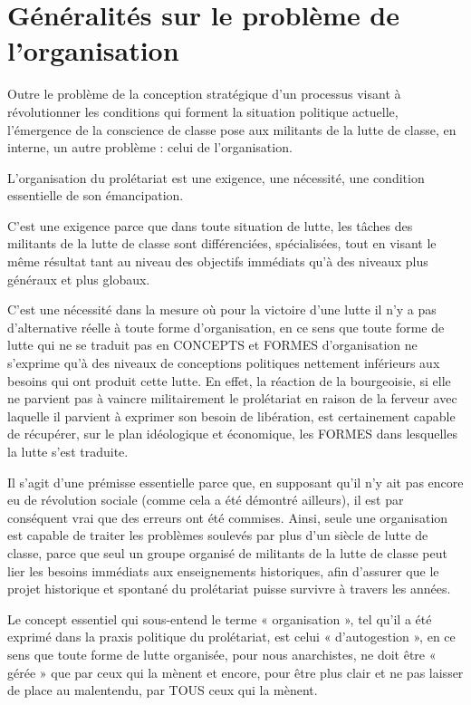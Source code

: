 \chapter{Généralités sur le problème de l'organisation}\hypertarget{gnralits-sur-le-problme-de-lorganisation}{}\label{gnralits-sur-le-problme-de-lorganisation}

Outre le problème de la conception stratégique d'un processus visant à révolutionner les conditions qui forment la situation politique actuelle, l'émergence de la conscience de classe pose aux militants de la lutte de classe, en interne, un autre problème : celui de l'organisation.

L'organisation du prolétariat est une exigence, une nécessité, une condition essentielle de son émancipation.

C'est une exigence parce que dans toute situation de lutte, les tâches des militants de la lutte de classe sont différenciées, spécialisées, tout en visant le même résultat tant au niveau des objectifs immédiats qu'à des niveaux plus généraux et plus globaux.

C'est une nécessité dans la mesure où pour la victoire d'une lutte il n'y a pas d'alternative réelle à toute forme d'organisation, en ce sens que toute forme de lutte qui ne se traduit pas en CONCEPTS et FORMES d'organisation ne s'exprime qu'à des niveaux de conceptions politiques nettement inférieurs aux besoins qui ont produit cette lutte. En effet, la réaction de la bourgeoisie, si elle ne parvient pas à vaincre militairement le prolétariat en raison de la ferveur avec laquelle il parvient à exprimer son besoin de libération, est certainement capable de récupérer, sur le plan idéologique et économique, les FORMES dans lesquelles la lutte s'est traduite.

Il s'agit d'une prémisse essentielle parce que, en supposant qu'il n'y ait pas encore eu de révolution sociale (comme cela a été démontré ailleurs), il est par conséquent vrai que des erreurs ont été commises. Ainsi, seule une organisation est capable de traiter les problèmes soulevés par plus d'un siècle de lutte de classe, parce que seul un groupe organisé de militants de la lutte de classe peut lier les besoins immédiats aux enseignements historiques, afin d'assurer que le projet historique et spontané du prolétariat puisse survivre à travers les années.

Le concept essentiel qui sous-entend le terme « organisation », tel qu'il a été exprimé dans la praxis politique du prolétariat, est celui « d'autogestion », en ce sens que toute forme de lutte organisée, pour nous anarchistes, ne doit être « gérée » que par ceux qui la mènent et encore, pour être plus clair et ne pas laisser de place au malentendu, par TOUS ceux qui la mènent.

